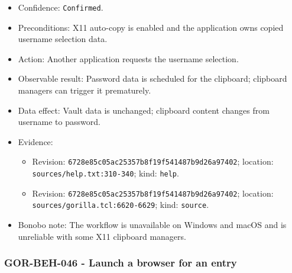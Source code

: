 \documentclass[
  letterpaper,
]{article}
\newcommand{\passthrough}[1]{#1}
\providecommand{\tightlist}{%
  \setlength{\itemsep}{0pt}\setlength{\parskip}{0pt}}
\begin{document}
\begin{itemize}
\tightlist
\item
  Confidence: \passthrough{\lstinline!Confirmed!}.
\item
  Preconditions: X11 auto-copy is enabled and the application owns copied username selection data.
\item
  Action: Another application requests the username selection.
\item
  Observable result: Password data is scheduled for the clipboard; clipboard managers can trigger it prematurely.
\item
  Data effect: Vault data is unchanged; clipboard content changes from username to password.
\item
  Evidence:

  \begin{itemize}
  \tightlist
  \item
    Revision: \nolinkurl{6728e85c05ac25357b8f19f541487b9d26a97402}; location: \nolinkurl{sources/help.txt:310-340};
    kind: \passthrough{\lstinline!help!}.
  \item
    Revision: \nolinkurl{6728e85c05ac25357b8f19f541487b9d26a97402}; location: \nolinkurl{sources/gorilla.tcl:6620-6629};
    kind: \passthrough{\lstinline!source!}.
  \end{itemize}
\item
  Bonobo note: The workflow is unavailable on Windows and macOS and is unreliable with some X11 clipboard managers.
\end{itemize}

\subsubsection{GOR-BEH-046 - Launch a browser for an entry}\label{gor-beh-046---launch-a-browser-for-an-entry}
\end{document}
